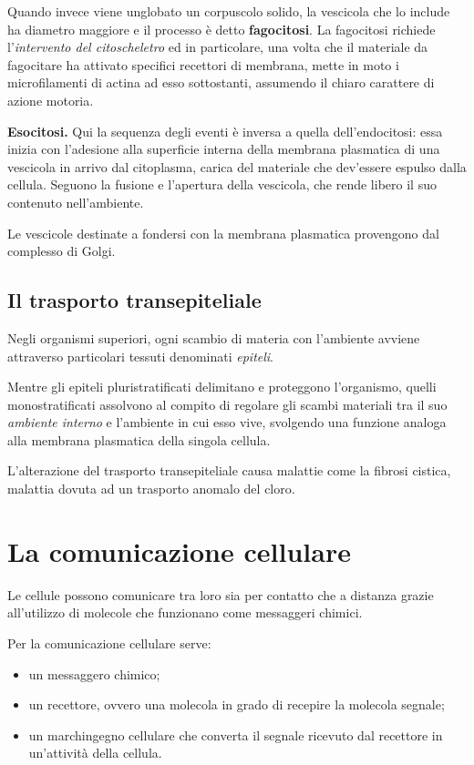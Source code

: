 \documentclass[]{article}
\begin{document}
Quando invece viene unglobato un corpuscolo solido, la vescicola che lo
include ha diametro maggiore e il processo è detto \textbf{fagocitosi}.
La fagocitosi richiede l'\emph{intervento del citoscheletro} ed in
particolare, una volta che il materiale da fagocitare ha attivato
specifici recettori di membrana, mette in moto i microfilamenti di
actina ad esso sottostanti, assumendo il chiaro carattere di azione
motoria.

\textbf{Esocitosi.} Qui la sequenza degli eventi è inversa a quella
dell'endocitosi: essa inizia con l'adesione alla superficie interna
della membrana plasmatica di una vescicola in arrivo dal citoplasma,
carica del materiale che dev'essere espulso dalla cellula. Seguono la
fusione e l'apertura della vescicola, che rende libero il suo contenuto
nell'ambiente.

Le vescicole destinate a fondersi con la membrana plasmatica provengono
dal complesso di Golgi.

\subsection{Il trasporto
transepiteliale}\label{il-trasporto-transepiteliale}

Negli organismi superiori, ogni scambio di materia con l'ambiente
avviene attraverso particolari tessuti denominati \emph{epiteli}.

Mentre gli epiteli pluristratificati delimitano e proteggono
l'organismo, quelli monostratificati assolvono al compito di regolare
gli scambi materiali tra il suo \emph{ambiente interno} e l'ambiente in
cui esso vive, svolgendo una funzione analoga alla membrana plasmatica
della singola cellula.

L'alterazione del trasporto transepiteliale causa malattie come la
fibrosi cistica, malattia dovuta ad un trasporto anomalo del cloro.

\section{La comunicazione cellulare}\label{la-comunicazione-cellulare}

Le cellule possono comunicare tra loro sia per contatto che a distanza
grazie all'utilizzo di molecole che funzionano come messaggeri chimici.

Per la comunicazione cellulare serve:

\begin{itemize}
\itemsep1pt\parskip0pt
\item
  un messaggero chimico;
\item
  un recettore, ovvero una molecola in grado di recepire la molecola
  segnale;
\item
  un marchingegno cellulare che converta il segnale ricevuto dal
  recettore in un'attività della cellula.
\end{itemize}
\end{document}
